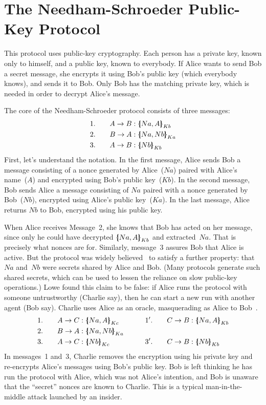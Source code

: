 \section{The Needham-Schroeder Public-Key Protocol}\label{sec:ns-protocol}

%
This protocol uses public-key cryptography. Each person has a private key, known only to
himself, and a public key, known to everybody. If Alice wants to send Bob a secret message, she
encrypts it using Bob's public key (which everybody knows), and sends it to Bob. Only Bob has the
matching private key, which is needed in order to decrypt Alice's message.

The core of the Needham-Schroeder protocol consists of three messages:
\begin{alignat*}{2}
  &1.&\quad  A\to B  &: \mathopen{\{\kern-.30em|} Na,A\mathclose{|\kern-.32em\}}\sb{Kb} \\
  &2.&\quad  B\to A  &: \mathopen{\{\kern-.30em|} Na,Nb\mathclose{|\kern-.32em\}}\sb{Ka} \\
  &3.&\quad  A\to B  &: \mathopen{\{\kern-.30em|} Nb\mathclose{|\kern-.32em\}}\sb{Kb}
\end{alignat*}
First, let's understand the notation. In the first message, Alice
sends Bob a message consisting of a nonce generated by Alice~($Na$)
paired  with Alice's name~($A$) and encrypted using Bob's public
key~($Kb$). In the second message, Bob sends Alice a message
consisting of $Na$ paired with a nonce generated by Bob~($Nb$), 
encrypted using Alice's public key~($Ka$). In the last message, Alice
returns $Nb$ to Bob, encrypted using his public key.

When Alice receives Message~2, she knows that Bob has acted on her
message, since only he could have decrypted
$\mathopen{\{\kern-.30em|} Na,A\mathclose{|\kern-.32em\}}\sb{Kb}$ and extracted~$Na$.  That is precisely what
nonces are for.  Similarly, message~3 assures Bob that Alice is
active.  But the protocol was widely believed~\cite{ban89} to satisfy a
further property: that
$Na$ and~$Nb$ were secrets shared by Alice and Bob.  (Many
protocols generate such shared secrets, which can be used
to lessen the reliance on slow public-key operations.)  
Lowe found this
claim to be false: if Alice runs the protocol with someone untrustworthy
(Charlie say), then he can start a new run with another agent (Bob say). 
Charlie uses Alice as an oracle, masquerading as
Alice to Bob~\cite{lowe-fdr}.
\begin{alignat*}{4}
  &1.&\quad  A\to C  &: \comp{Na,A}\sb{Kc}   &&
      \qquad 1'.&\quad  C\to B  &: \comp{Na,A}\sb{Kb} \\
  &2.&\quad  B\to A  &: \comp{Na,Nb}\sb{Ka} \\
  &3.&\quad  A\to C  &: \comp{Nb}\sb{Kc}  &&
      \qquad 3'.&\quad  C\to B  &: \comp{Nb}\sb{Kb}
\end{alignat*}
In messages~1 and~3, Charlie removes the encryption using his private
key and re-encrypts Alice's messages using Bob's public key. Bob is
left thinking he has run the protocol with Alice, which was not
Alice's intention, and Bob is unaware that the ``secret'' nonces are
known to Charlie.  This is a typical man-in-the-middle attack launched
by an insider.

